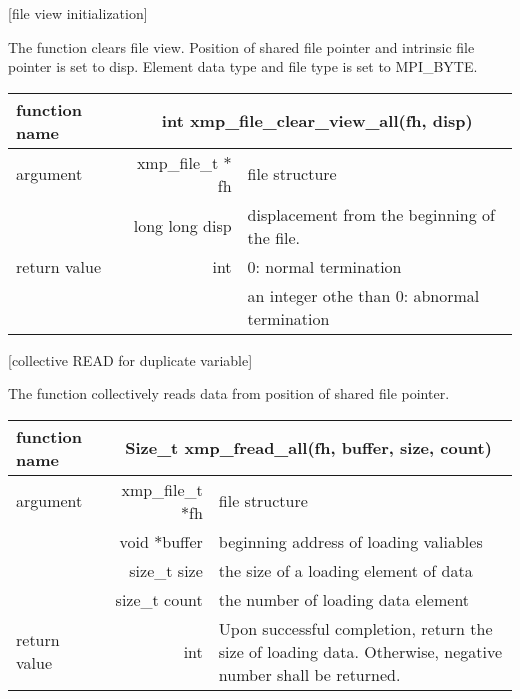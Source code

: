    
   [file view initialization]

   The function clears file view.
   Position of shared file pointer and intrinsic file pointer is set to
   disp.
   Element data type and file type is set to MPI\_BYTE.
   
   \begin{table}[h]
    \begin{center}
     \begin{tabular}{|l|r|p{80mm}|}
      \hline
      {\bf function name}  & \multicolumn{2}{c|}{\bf int xmp\_file\_clear\_view\_all(fh,
      disp)} \\ \hline \hline
      argument & xmp\_file\_t $*$fh & file structure \\ \cline{2-3}
      & long long disp & displacement from the beginning of the file. \\ \hline
      return value & int & 0: normal termination \\
      &  & an integer othe than 0: abnormal termination \\ \hline
      \end{tabular}
     \end{center}
    \label{tb:aaa}
   \end{table}


   [collective READ for duplicate variable]

   The function collectively reads data from position of shared file
   pointer.

   \begin{table}[h]
    \begin{center}
     \begin{tabular}{|l|r|p{80mm}|}
      \hline
      {\bf function name}  & \multicolumn{2}{c|}{\bf Size\_t
      xmp\_fread\_all(fh, buffer, size, count)}  \\ \hline \hline
      argument & xmp\_file\_t $*$fh & file structure \\ \cline{2-3}
      & void $*$buffer & beginning address of loading valiables \\ \cline{2-3}
      & size\_t size & the size of a loading element of data \\ \cline{2-3}
      & size\_t count & the number of loading data element \\ \hline
      return value & int & Upon successful completion, return the size
	      of loading data. Otherwise, negative number shall be
	      returned. \\ \hline
      \end{tabular}
     \end{center}
    \label{tb:aaa}
   \end{table}


